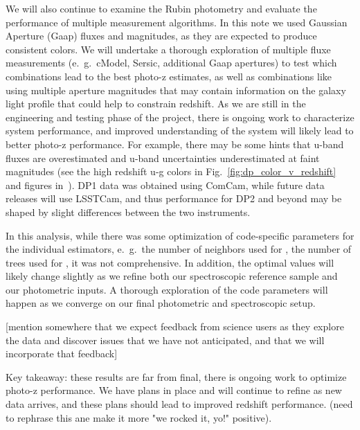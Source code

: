 We will also continue to examine the Rubin photometry and evaluate the performance of multiple measurement algorithms.  In this note we used Gaussian Aperture (Gaap) fluxes and magnitudes, as they are expected to produce consistent colors.  We will undertake a thorough exploration of multiple fluxe measurements (e.~g.~cModel, Sersic, additional Gaap apertures) to test which combinations lead to the best photo-z estimates, as well as combinations like using multiple aperture magnitudes that may contain information on the galaxy light profile that could help to constrain redshift.  As we are still in the engineering and testing phase of the project, there is ongoing work to characterize system performance, and improved understanding of the system will likely lead to better photo-z performance.  For example, there may be some hints that u-band fluxes are overestimated and u-band uncertainties underestimated at faint magnitudes (see the high redshift u-g colors in Fig.~\ref{fig:dp_color_v_redshift} and figures in~\citet{RTN:095}).  DP1 data was obtained using ComCam, while future data releases will use LSSTCam, and thus performance for DP2 and beyond may be shaped by slight differences between the two instruments.  

In this analysis, while there was some optimization of code-specific parameters for the individual estimators, e.~g.~the number of neighbors used for , the number of trees used for , it was not comprehensive.  In addition, the optimal values will likely change slightly as we refine both our spectroscopic reference sample and our photometric inputs.  A thorough exploration of the code parameters will happen as we converge on our final photometric and spectroscopic setup.

[mention somewhere that we expect feedback from science users as they explore the data and discover issues that we have not anticipated, and that we will incorporate that feedback]

Key takeaway: these results are far from final, there is ongoing work to optimize photo-z performance.  We have plans in place and will continue to refine as new data arrives, and these plans should lead to improved redshift performance. (need to rephrase this ane make it more "we rocked it, yo!" positive).




\pagebreak



